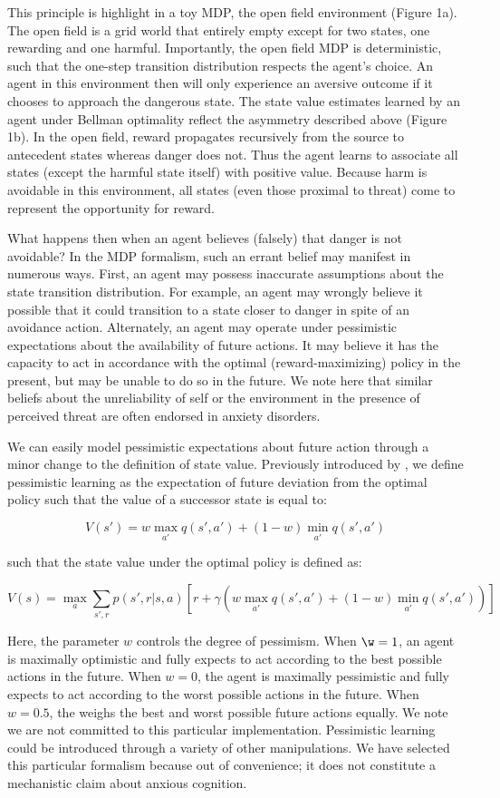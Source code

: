 \documentclass[11pt]{article} %
\begin{document}
This principle is highlight in a toy MDP, the open field environment (Figure 1a). The open field is a grid world that entirely empty except for two states, one rewarding and one harmful. Importantly, the open field MDP is deterministic, such that the one-step transition distribution respects the agent's choice. An agent in this environment then will only experience an aversive outcome if it chooses to approach the dangerous state. The state value estimates learned by an agent under Bellman optimality reflect the asymmetry described above (Figure 1b). In the open field, reward propagates recursively from the source to antecedent states whereas danger does not. Thus the agent learns to associate all states (except the harmful state itself) with positive value. Because harm is avoidable in this environment, all states (even those proximal to threat) come to represent the opportunity for reward.

What happens then when an agent believes (falsely) that danger is not avoidable? In the MDP formalism, such an errant belief may manifest in numerous ways. First, an agent may possess inaccurate assumptions about the state transition distribution. For example, an agent may wrongly believe it possible that it could transition to a state closer to danger in spite of an avoidance action. Alternately, an agent may operate under pessimistic expectations about the availability of future actions. It may believe it has the capacity to act in accordance with the optimal (reward-maximizing) policy in the present, but may be unable to do so in the future. We note here that similar beliefs about the unreliability of self or the environment in the presence of perceived threat are often endorsed in anxiety disorders.

We can easily model pessimistic expectations about future action through a minor change to the definition of state value. Previously introduced by \cite{Gaskett2003}, we define pessimistic learning as the expectation of future deviation from the optimal policy such that the value of a successor state is equal to:

$$ V(s') = w \max_{a'} q(s',a') + (1 - w) \min_{a'} q(s',a') $$

such that the state value under the optimal policy is defined as:

$$ V(s) = \max_a \sum_{s',r}p(s',r|s,a) \left[ r + \gamma \left( w \max_{a'} q(s',a') + (1 - w) \min_{a'} q(s',a') \right) \right] $$

Here, the parameter $w$ controls the degree of pessimism. When $\w = 1$, an agent is maximally optimistic and fully expects to act according to the best possible actions in the future. When $w = 0$, the agent is maximally pessimistic and fully expects to act according to the worst possible actions in the future. When $w = 0.5$, the weighs the best and worst possible future actions equally. We note we are not committed to this particular implementation. Pessimistic learning could be introduced through a variety of other manipulations. We have selected this particular formalism because out of convenience; it does not constitute a mechanistic claim about anxious cognition.
\end{document}
